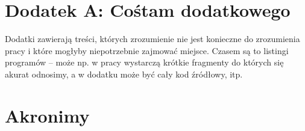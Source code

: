 \documentclass[12pt,a4paper,leqno,oneside,titlepage]{book}
\begin{document}
\newpage



\appendix
{}

\chapter*{Dodatek A: Cośtam dodatkowego}

Dodatki zawierają treści, których zrozumienie nie jest konieczne do zrozumienia pracy i które mogłyby niepotrzebnie zajmować miejsce. Czasem są to listingi programów -- może np. w pracy wystarczą krótkie fragmenty do których się akurat odnosimy, a w dodatku może być cały kod źródłowy, itp.

\chapter*{Akronimy}
\begin{acronym}
\end{acronym}
\end{document}
